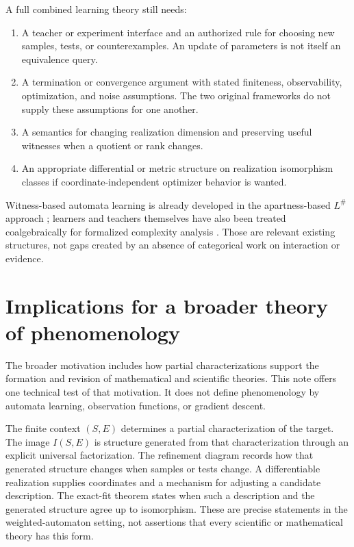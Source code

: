 \documentclass[11pt]{article}
\theoremstyle{definition}
\begin{document}
A full combined learning theory still needs:
\begin{enumerate}[leftmargin=*,itemsep=3pt]
\item A teacher or experiment interface and an authorized rule for choosing
new samples, tests, or counterexamples. An update of parameters is not itself
an equivalence query.
\item A termination or convergence argument with stated finiteness,
observability, optimization, and noise assumptions. The two original
frameworks do not supply these assumptions for one another.
\item A semantics for changing realization dimension and preserving useful
witnesses when a quotient or rank changes.
\item An appropriate differential or metric structure on realization
isomorphism classes if coordinate-independent optimizer behavior is wanted.
\end{enumerate}
Witness-based automata learning is already developed in the apartness-based
$L^{\#}$ approach \cite{apartness}; learners and teachers themselves have also
been treated coalgebraically for formalized complexity analysis
\cite{coalgebraic}. Those are relevant existing structures, not gaps created
by an absence of categorical work on interaction or evidence.

\section{Implications for a broader theory of phenomenology}

The broader motivation includes how partial characterizations support the
formation and revision of mathematical and scientific theories. This note
offers one technical test of that motivation. It does not define phenomenology
by automata learning, observation functions, or gradient descent.

The finite context $(S,E)$ determines a partial characterization of the target.
The image $I(S,E)$ is structure generated from that characterization through
an explicit universal factorization. The refinement diagram records how that
generated structure changes when samples or tests change. A differentiable
realization supplies coordinates and a mechanism for adjusting a candidate
description. The exact-fit theorem states when such a description and the
generated structure agree up to isomorphism. These are precise statements in
the weighted-automaton setting, not assertions that every scientific or
mathematical theory has this form.
\end{document}
